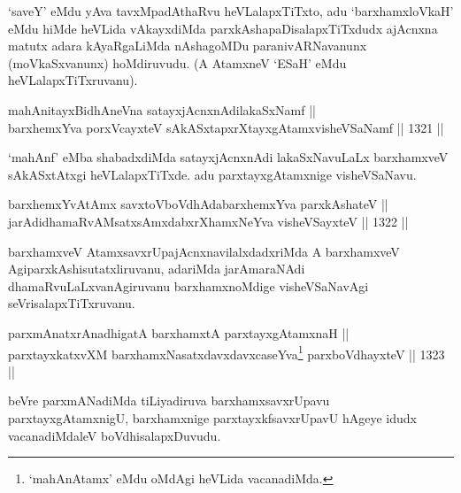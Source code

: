 \begin{artha}
`saveY' eMdu yAva tavxMpadAthaRvu heVLalapxTiTxto, adu `barxhamxloVkaH' eMdu hiMde heVLida vAkayxdiMda parxkAshapaDisalapxTiTxdudx ajAcnxna matutx adara kAyaRgaLiMda nAshagoMDu paranivARNavanunx (moVkaSxvanunx) hoMdiruvudu. (A AtamxneV `ESaH' eMdu heVLalapxTiTxruvanu).
\end{artha}

\begin{shl}
mahAnitayxBidhAneVna satayxjAcnxnAdilakaSxNamf ||  \\
barxhemxYva porxVcayxteV sAkASxtapxrXtayxgAtamxvisheVSaNamf \hfill || 1321 ||  
\end{shl}

\begin{artha}
`mahAnf' eMba shabadxdiMda satayxjAcnxnAdi lakaSxNavuLaLx barxhamxveV sAkASxtAtxgi heVLalapxTiTxde. adu parxtayxgAtamxnige visheVSaNavu.
\end{artha}


\begin{shl}
barxhemxYvA\s \s tAmx savxtoV\s boVdhAdabarxhemxYva parxkAshateV || \\
jarAdidhamaRvAMsatxsAmxdabxrXhamxNeYva visheVSayxteV \hfill || 1322 ||  
\end{shl}

\begin{artha}
barxhamxveV AtamxsavxrUpajAcnxnavilalxdadxriMda A barxhamxveV Agi\break parxkAshisutatxliruvanu, adariMda jarAmaraNAdi dhamaRvuLaLxva\-\break nAgiruvanu barxhamxnoMdige visheVSaNavAgi seVrisalapxTiTxruvanu.
\end{artha}


\begin{shl}
parxmAnatxrAnadhigatA barxhamxtA parxtayxgAtamxnaH || \\
parxtayxkatxvXM barxhamxNasatxdavxdavxcaseYva\footnote{`mahAnAtamx' eMdu oMdAgi heVLida vacanadiMda.} parxboVdhayxteV \hfill || 1323 ||  
\end{shl}


\begin{artha}
beVre parxmANadiMda tiLiyadiruva barxhamxsavxrUpavu parxtayxgAtamxnigU, barxhamxnige parxtayxkfsavxrUpavU hAgeye idudx vacanadiMdaleV boVdhisalapxDuvudu.
\end{artha}


